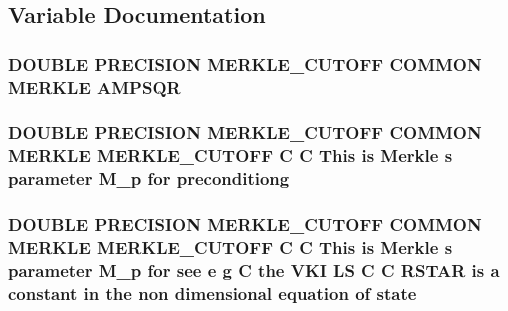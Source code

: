 \subsection{Variable Documentation}
\hypertarget{merkle_8com_a090e7861d41fe8b944374d3c9f7365bd}{
\subsubsection[{A\-M\-P\-S\-Q\-R}]{\setlength{\rightskip}{0pt plus 5cm}D\-O\-U\-B\-L\-E P\-R\-E\-C\-I\-S\-I\-O\-N M\-E\-R\-K\-L\-E\-\_\-\-C\-U\-T\-O\-F\-F C\-O\-M\-M\-O\-N M\-E\-R\-K\-L\-E A\-M\-P\-S\-Q\-R}}\label{merkle_8com_a090e7861d41fe8b944374d3c9f7365bd}
\hypertarget{merkle_8com_a0598863afc1fabc08a4d63618ed6d7d1}{
\subsubsection[{preconditiong}]{\setlength{\rightskip}{0pt plus 5cm}D\-O\-U\-B\-L\-E P\-R\-E\-C\-I\-S\-I\-O\-N M\-E\-R\-K\-L\-E\-\_\-\-C\-U\-T\-O\-F\-F C\-O\-M\-M\-O\-N M\-E\-R\-K\-L\-E M\-E\-R\-K\-L\-E\-\_\-\-C\-U\-T\-O\-F\-F C C This is Merkle s parameter M\-\_\-p for preconditiong}}\label{merkle_8com_a0598863afc1fabc08a4d63618ed6d7d1}
\hypertarget{merkle_8com_a0ca46ab387e5b2d25720de7e533a6180}{
\subsubsection[{state}]{\setlength{\rightskip}{0pt plus 5cm}D\-O\-U\-B\-L\-E P\-R\-E\-C\-I\-S\-I\-O\-N M\-E\-R\-K\-L\-E\-\_\-\-C\-U\-T\-O\-F\-F C\-O\-M\-M\-O\-N M\-E\-R\-K\-L\-E M\-E\-R\-K\-L\-E\-\_\-\-C\-U\-T\-O\-F\-F C C This is Merkle s parameter M\-\_\-p for see e g C the V\-K\-I L\-S C C R\-S\-T\-A\-R is a constant in the non dimensional equation of state}}\label{merkle_8com_a0ca46ab387e5b2d25720de7e533a6180}

